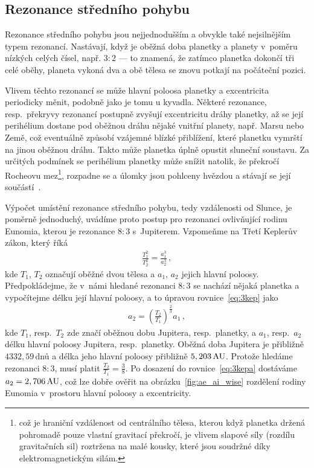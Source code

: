 \documentclass[A4paper, 12pt, oneside]{book}
\begin{document}
\subsection{Rezonance středního pohybu} \label{sec:meanmotion}

Rezonance středního pohybu jsou nejjednodušším a obvykle také nejsilnějším typem rezonancí. Nastávají, když je oběžná doba planetky a planety v~poměru nízkých celých čísel, např. $3:2$ --- to znamená, že zatímco planetka dokončí tři celé oběhy, planeta vykoná dva a obě tělesa se znovu potkají na počáteční pozici. 

Vlivem těchto rezonancí se může hlavní poloosa planetky a excentricita periodicky měnit, podobně jako je tomu u kyvadla. Některé rezonance, resp.\ překryvy rezonancí postupně zvyšují excentricitu dráhy planetky, až se její perihélium dostane pod oběžnou dráhu nějaké vnitřní planety, např. Marsu nebo Země, což eventuálně způsobí vzájemné blízké přiblížení, které planetku vymrští na jinou oběžnou dráhu. Takto může planetka úplně opustit sluneční soustavu. Za určitých podmínek se perihélium planetky může snížit natolik, že překročí Rocheovu mez\footnote{což je hraniční vzdálenost od centrálního tělesa, kterou když planetka držená pohromadě pouze vlastní gravitací překročí, je vlivem slapové síly (rozdílu gravitačních sil) roztržena na malé kousky, které jsou soudržné díky elektromagnetickým silám.}, rozpadne se a úlomky jsou pohlceny hvězdou a stávají se její součástí~\cite{pichierri17}.

Výpočet umístění rezonance středního pohybu, tedy vzdálenosti od Slunce, je poměrně jednoduchý, uvádíme proto postup pro rezonanci ovlivňující rodinu Eunomia, kterou je rezonance $8:3$ s~Jupiterem. Vzpomeňme na Třetí Keplerův zákon, který říká
\begin{align} \label{eq:3kep}
	\frac{T_1^2}{T_2^2}=\frac{a_1^3}{a_2^3}\,, 
\end{align}
kde $T_1$, $T_2$ označují oběžné dvou tělesa a $a_1$, $a_2$ jejich hlavní poloosy. Předpokládejme, že v~námi hledané rezonanci $8:3$ se nachází nějaká planetka a vypočítejme délku její hlavní poloosy, a to úpravou rovnice~\eqref{eq:3kep} jako
\begin{align} \label{eq:3kepa}
	a_2=\left(\frac{T_2}{T_1}\right)^{\frac{2}{3}}a_1\,,
\end{align}
kde $T_1$, resp.\ $T_2$ zde značí oběžnou dobu Jupitera, resp.\ planetky, a $a_1$, resp.\ $a_2$ délku hlavní poloosy Jupitera, resp.\ planetky. Oběžná doba Jupitera je přibližně $4332,59\,$dnů a délka jeho hlavní poloosy přibližně $5,203\,{\rm AU}$. Protože hledáme rezonanci $8:3$, musí platit $\frac{T_2}{T_1}=\frac{3}{8}$. Po dosazení do rovnice~\eqref{eq:3kepa} dostáváme $a_2=2,706\,{\rm AU}$, což lze dobře ověřit na obrázku~\ref{fig:ae_ai_wise} rozdělení rodiny Eunomia v~prostoru hlavní poloosy a excentricity.
\end{document}

